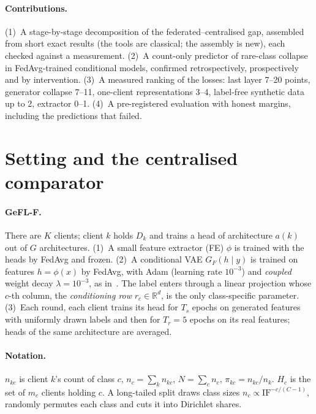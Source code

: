 \documentclass[10pt]{article}
\theoremstyle{plain}
\theoremstyle{definition}
\newcommand{\R}{\mathbb{R}}
\begin{document}
\paragraph{Contributions.} (1)~A stage-by-stage decomposition of the federated--centralised gap, assembled from short
exact results (the tools are classical; the assembly is new), each checked against a measurement. (2)~A count-only
predictor of rare-class collapse in FedAvg-trained conditional models, confirmed retrospectively, prospectively and by
intervention. (3)~A measured ranking of the losses: last layer 7--20 points, generator collapse 7--11, one-client
representations 3--4, label-free synthetic data up to 2, extractor 0--1. (4)~A pre-registered evaluation with honest
margins, including the predictions that failed.

\section{Setting and the centralised comparator}\label{sec:setting}

\paragraph{GeFL-F.} There are $K$ clients; client $k$ holds $D_k$ and trains a head of architecture $a(k)$ out of $G$
architectures. (1)~A small feature extractor (FE) $\phi$ is trained with the heads by FedAvg and frozen. (2)~A
conditional VAE $G_F(h\mid y)$ is trained on features $h=\phi(x)$ by FedAvg, with Adam (learning rate $10^{-3}$) and
\emph{coupled} weight decay $\lambda=10^{-3}$, as in~\cite{kang2025gefl}. The label enters through a linear projection
whose $c$-th column, the \emph{conditioning row} $r_c\in\R^d$, is the only class-specific parameter. (3)~Each round,
each client trains its head for $T_s$ epochs on generated features with uniformly drawn labels and then for $T_r=5$
epochs on its real features; heads of the same architecture are averaged.

\paragraph{Notation.} $n_{kc}$ is client $k$'s count of class $c$, $n_c=\sum_kn_{kc}$, $N=\sum_cn_c$,
$\pi_{kc}=n_{kc}/n_k$. $H_c$ is the set of $m_c$ clients holding $c$. A long-tailed split draws class sizes
$n_c\propto\mathrm{IF}^{-c/(C-1)}$, randomly permutes each class and cuts it into Dirichlet shares.
\end{document}
